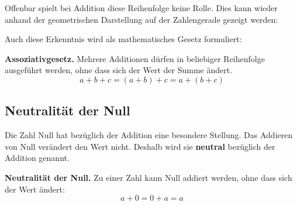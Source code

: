Offenbar spielt bei Addition diese Reihenfolge keine Rolle. Dies kann wieder anhand der geometrischen Darstellung auf der Zahlengerade gezeigt werden:
\begin{center}
\end{center}
Auch diese Erkenntnis wird als mathematisches Gesetz formuliert:
\begin{theorem}
  \textbf{Assoziativgesetz.} Mehrere Additionen dürfen in beliebiger Reihenfolge ausgeführt werden, ohne dass sich der Wert der Summe ändert.
  \[
    a + b + c = (a + b) + c = a + (b + c)
  \]
\end{theorem}

\subsection{Neutralität der Null}

Die Zahl Null hat bezüglich der Addition eine besondere Stellung. Das Addieren von Null verändert den Wert nicht. Deshalb wird sie \textbf{neutral} bezüglich der Addition genannt.
\begin{theorem}
  \textbf{Neutralität der Null.} Zu einer Zahl kann Null addiert werden, ohne dass sich der Wert ändert:
  \[
    a + 0 = 0 + a = a
  \]
\end{theorem}
